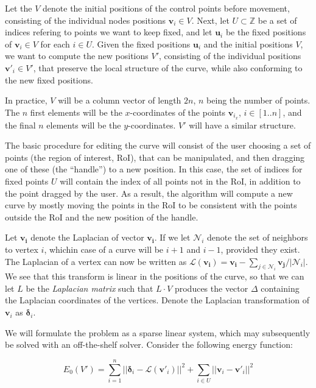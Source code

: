 \documentclass[english]{article}
\begin{document}
Let the $V$ denote the initial positions of the control points before movement, consisting of the individual nodes positions $\mathbf{v}_i \in V$. Next, let $U \subset \mathbb{Z}$ be a set of indices refering to points we want to keep fixed, and let $\mathbf{u}_i$ be the fixed positions of $\mathbf{v}_i \in V$ for each $ i \in U$. Given the fixed positions $\mathbf{u}_i$ and the initial positions $V$, we want to compute the new positions $V'$, consisting of the individual positions $\mathbf{v}'_i \in V'$, that preserve the local structure of the curve, while also conforming to the new fixed positions.

In practice, $V$ will be a column vector of length $2n$, $n$ being the number of points. The $n$ first elements will be the $x$-coordinates of the points $\mathbf{v}_{i_x}$, $i \in [1..n]$, and the final $n$ elements will be the $y$-coordinates. $V'$ will have a similar structure.

The basic procedure for editing the curve will consist of the user choosing a set of points (the region of interest, RoI), that can be manipulated, and then dragging one of these (the ``handle'') to a new position. In this case, the set of indices for fixed points $U$ will contain the index of all points not in the RoI, in addition to the point dragged by the user. As a result, the algorithm will compute a new curve by mostly moving the points in the RoI to be consistent with the points outside the RoI and the new position of the handle.

Let $\mathcal{\mathbf{v_i}}$ denote the Laplacian of vector $\mathbf{v_i}$. If we let $\mathcal{N}_i$ denote the set of neighbors to vertex $i$, whichin case of a curve  will be $i+1$ and $i - 1$, provided they exist. The Laplacian of a vertex can now be written as $\mathcal{L}(\mathbf{v_i}) = \mathbf{v_i} - \sum_{j \in \mathcal{N}_i}\mathbf{v_j} / |\mathcal{N}_i|$. We see that this transform is linear in the positions of the curve, so that we can let $L$ be the \textit{Laplacian matrix} such that $L\cdot V$ produces the vector $\Delta$ containing the Laplacian coordinates of the vertices. Denote the Laplacian transformation of $\mathbf{v}_i$ as $\mathbf{\delta}_i$.

We will formulate the problem as a sparse linear system, which may subsequently be solved with an off-the-shelf solver. Consider the following energy function:

\[
E_0(V') = \sum_{i = 1}^n || \mathbf{\delta}_i - \mathcal{L}(\mathbf{v'}_i) ||^2 + \sum_{i \in U} || \mathbf{v}_i - \mathbf{v'}_i||^2
\]
\end{document}
